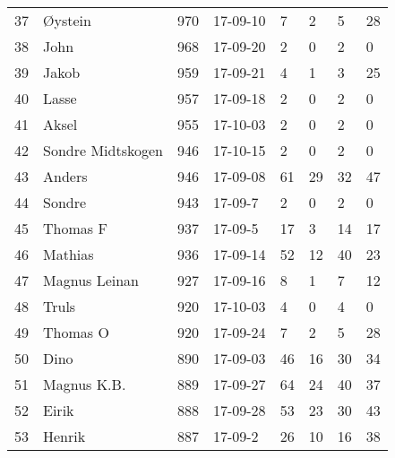 \begin{longtable}{|r|l|r|l|l|l|l|l|}
37 &              Øystein &   970 &    17-09-10 &               7 &     2 &       5 &        28 \\
38 &                 John &   968 &    17-09-20 &               2 &     0 &       2 &         0 \\
39 &                Jakob &   959 &    17-09-21 &               4 &     1 &       3 &        25 \\
40 &                Lasse &   957 &    17-09-18 &               2 &     0 &       2 &         0 \\
41 &                Aksel &   955 &    17-10-03 &               2 &     0 &       2 &         0 \\
42 &    Sondre Midtskogen &   946 &    17-10-15 &               2 &     0 &       2 &         0 \\
43 &               Anders &   946 &    17-09-08 &              61 &    29 &      32 &        47 \\
44 &               Sondre &   943 &     17-09-7 &               2 &     0 &       2 &         0 \\
45 &             Thomas F &   937 &     17-09-5 &              17 &     3 &      14 &        17 \\
46 &              Mathias &   936 &    17-09-14 &              52 &    12 &      40 &        23 \\
47 &        Magnus Leinan &   927 &    17-09-16 &               8 &     1 &       7 &        12 \\
48 &                Truls &   920 &    17-10-03 &               4 &     0 &       4 &         0 \\
49 &             Thomas O &   920 &    17-09-24 &               7 &     2 &       5 &        28 \\
50 &                 Dino &   890 &    17-09-03 &              46 &    16 &      30 &        34 \\
51 &          Magnus K.B. &   889 &    17-09-27 &              64 &    24 &      40 &        37 \\
52 &                Eirik &   888 &    17-09-28 &              53 &    23 &      30 &        43 \\
53 &               Henrik &   887 &     17-09-2 &              26 &    10 &      16 &        38 \\
\end{longtable}

